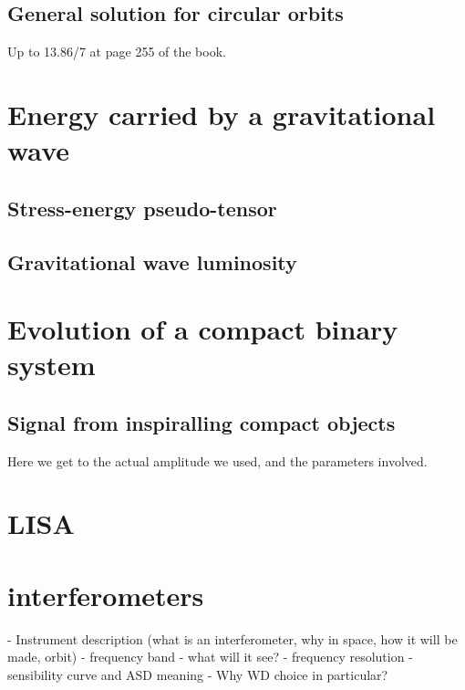 \subsection{General solution for circular orbits}
Up to 13.86/7 at page 255 of the book.

\section{Energy carried by a gravitational wave}
\subsection{Stress-energy pseudo-tensor}
\subsection{Gravitational wave luminosity}

\section{Evolution of a compact binary system}
\subsection{Signal from inspiralling compact objects}
Here we get to the actual amplitude we used, and the parameters involved.

\section{LISA}
\section{interferometers}



- Instrument description (what is an interferometer, why in space, how it will be made, orbit)
- frequency band - what will it see?
- frequency resolution
- sensibility curve and ASD meaning
- Why WD choice in particular?

